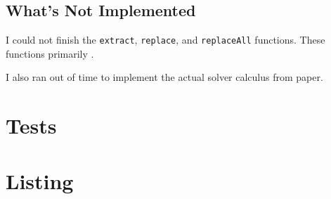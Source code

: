 \documentclass[letterpaper, 11pt]{article}
\begin{document}
\subsection{What's Not Implemented}\label{sec:not_impl}

I could not finish the \lstinline{extract}, \lstinline{replace}, and \lstinline{replaceAll} functions. 
These functions primarily .

I also ran out of time to implement the actual solver calculus from paper.


\section{Tests}\label{sec:tests}


\section{Listing}\label{sec:code}
\end{document}
